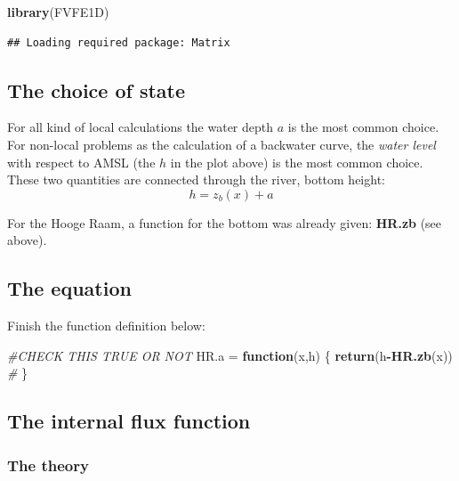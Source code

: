 \documentclass[
]{article}
\newenvironment{Shaded}{\begin{snugshade}}{\end{snugshade}}
\newcommand{\CommentTok}[1]{\textcolor[rgb]{0.56,0.35,0.01}{\textit{#1}}}
\newcommand{\ControlFlowTok}[1]{\textcolor[rgb]{0.13,0.29,0.53}{\textbf{#1}}}
\newcommand{\FunctionTok}[1]{\textcolor[rgb]{0.13,0.29,0.53}{\textbf{#1}}}
\newcommand{\NormalTok}[1]{#1}
\newcommand{\OtherTok}[1]{\textcolor[rgb]{0.56,0.35,0.01}{#1}}
\newcommand{\SpecialCharTok}[1]{\textcolor[rgb]{0.81,0.36,0.00}{\textbf{#1}}}
\begin{document}
\begin{Shaded}
\begin{Highlighting}[]
\FunctionTok{library}\NormalTok{(FVFE1D)}
\end{Highlighting}
\end{Shaded}

\begin{verbatim}
## Loading required package: Matrix
\end{verbatim}

\hypertarget{the-choice-of-state}{%
\subsection{The choice of state}\label{the-choice-of-state}}

For all kind of local calculations the water depth \(a\) is the most
common choice. For non-local problems as the calculation of a backwater
curve, the \emph{water level} with respect to AMSL (the \(h\) in the
plot above) is the most common choice. These two quantities are
connected through the river, bottom height:\\
\[
  h = z_b(x)+a 
\]

For the Hooge Raam, a function for the bottom was already given:
\textbf{HR.zb} (see above).

\hypertarget{the-equation}{%
\subsection{The equation}\label{the-equation}}

Finish the function definition below:

\begin{Shaded}
\begin{Highlighting}[]
\CommentTok{\#CHECK THIS TRUE OR NOT}
\NormalTok{HR.a }\OtherTok{=} \ControlFlowTok{function}\NormalTok{(x,h)}
\NormalTok{\{}
  \FunctionTok{return}\NormalTok{(h}\SpecialCharTok{{-}}\FunctionTok{HR.zb}\NormalTok{(x)) }\CommentTok{\#}
\NormalTok{\}}
\end{Highlighting}
\end{Shaded}

\hypertarget{the-internal-flux-function}{%
\subsection{The internal flux
function}\label{the-internal-flux-function}}

\hypertarget{the-theory}{%
\subsubsection{The theory}\label{the-theory}}
\end{document}
